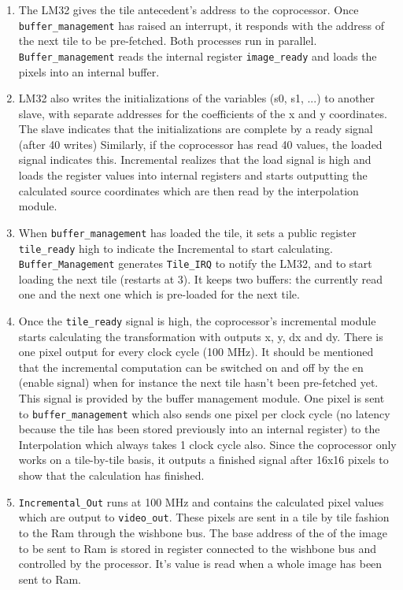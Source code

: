 \begin{enumerate}
\item The LM32 gives the tile antecedent's address to the coprocessor. Once \texttt{buffer\_management} has raised an interrupt, it responds with the address of the next tile to be pre-fetched. Both processes run in parallel. \texttt{Buffer\_management} reads the internal register \texttt{image\_ready} and loads the pixels into an internal buffer.

\item LM32 also writes the initializations of the variables (s0, s1, ...)  to another slave, with separate addresses for the coefficients of the x and y coordinates. The slave indicates that the initializations are complete by a ready signal (after 40 writes) Similarly, if the coprocessor has read 40 values, the loaded signal indicates this.
Incremental realizes that the load signal is high and loads the register values into internal registers and starts outputting the calculated source coordinates which are then read by the interpolation module.

\item When \texttt{buffer\_management} has loaded the tile, it sets a public register \texttt{tile\_ready} high to indicate the Incremental to start calculating.
\texttt{Buffer\_Management} generates \texttt{Tile\_IRQ} to notify the LM32, and to start loading the next tile (restarts at 3). 
It keeps two buffers: the currently read one and the next one which is pre-loaded for the next 	tile.

\item Once the \texttt{tile\_ready} signal is high, the coprocessor's incremental module starts calculating the transformation with outputs x, y, dx and dy. There is one pixel output for every clock cycle (100 MHz). It should be mentioned that the incremental computation can be switched on and off by the en (enable signal) when for instance the next tile hasn't been pre-fetched yet. This signal is provided by the buffer management module.
One pixel is sent to \texttt{buffer\_management} which also sends one pixel per clock cycle (no latency because the tile has been stored previously into an internal register) to the Interpolation which always takes 1 clock cycle also.
Since the coprocessor only works on a tile-by-tile basis, it outputs a finished signal after 16x16 pixels to show that the calculation has finished.

\item \texttt{Incremental\_Out} runs at 100 MHz and contains the calculated pixel values which are output to \texttt{video\_out}. These pixels are sent in a tile by tile fashion to the Ram through the wishbone bus. The base address of the of the image to be sent to Ram is stored in register connected to the wishbone bus and controlled by the processor. It's value is read when a whole image has been sent to Ram. 


\end{enumerate}
